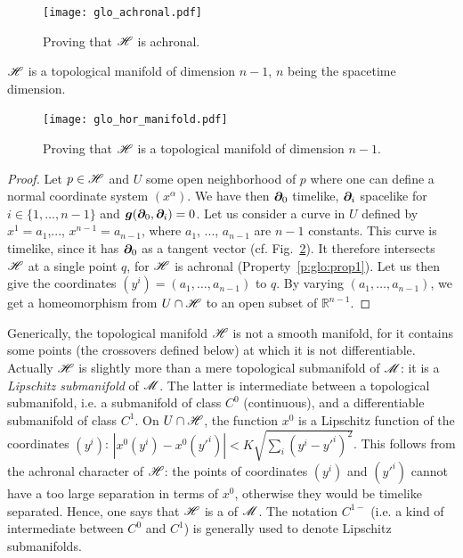 \begin{figure}
\centerline{\texttt{[image: glo\_achronal.pdf]}}
\caption[]{\label{f:glo:achronal} \footnotesize
Proving that $\mathscr{H}$ is achronal.}
\end{figure}


\begin{prop}
\label{p:glo:prop2}
$\mathscr{H}$ is a topological manifold of dimension $n-1$, $n$ being the spacetime
dimension.
\end{prop}

\begin{figure}
\centerline{\texttt{[image: glo\_hor\_manifold.pdf]}}
\caption[]{\label{f:glo:hor_manifold} \footnotesize
Proving that $\mathscr{H}$ is a topological manifold of dimension $n-1$.}
\end{figure}

\begin{proof}
Let $p\in\mathscr{H}$ and $U$ some open neighborhood of $p$ where one can define
a normal coordinate system $(x^\alpha)$. We have then $\bm{\partial}_0$ timelike,
$\bm{\partial}_i$ spacelike for $i\in\{1,\ldots,n-1\}$ and $\bm{g}(\bm{\partial}_0, \bm{\partial}_i) = 0$.
Let us consider a curve in $U$ defined by $x^1 = a_1$,..., $x^{n-1} = a_{n-1}$,
where $a_1$, ..., $a_{n-1}$ are $n-1$ constants.
This curve is timelike, since it has $\bm{\partial}_0$ as a tangent vector
(cf. Fig.~\ref{f:glo:hor_manifold}).
It therefore intersects $\mathscr{H}$ at a single point $q$, for $\mathscr{H}$ is achronal
(Property~\ref{p:glo:prop1}).
Let us then give the coordinates $(y^i) = (a_1,\ldots,a_{n-1})$ to $q$.
By varying $(a_1,\ldots,a_{n-1})$, we get a homeomorphism from $U\cap\mathscr{H}$
to an open subset of $\mathbb{R}^{n-1}$.
\end{proof}

\begin{remark}
Generically, the topological manifold $\mathscr{H}$ is not a smooth manifold, for it
contains some points (the crossovers defined below) at which it is not differentiable.
Actually $\mathscr{H}$ is slightly more than a mere topological submanifold of $\mathscr{M}$: it is a
\emph{Lipschitz submanifold} of $\mathscr{M}$. The latter is
intermediate between a topological submanifold, i.e.
a submanifold of class $C^0$ (continuous), and a differentiable submanifold of
class $C^1$. On $U\cap\mathscr{H}$, the function $x^0$ is a Lipschitz function
of the coordinates $(y^i)$: $\left|x^0(y^i) - x^0({y'}^i)\right| < K \sqrt{\sum_i (y^i - {y'}^i)^2}$.
This follows from the achronal character of $\mathscr{H}$: the points of coordinates
$(y^i)$ and $({y'}^i)$ cannot have a too large separation in terms of $x^0$,
otherwise they would be timelike separated.
Hence, one says that $\mathscr{H}$ is a  of $\mathscr{M}$. The notation $C^{1-}$ (i.e. a kind of intermediate between
$C^0$ and $C^1$) is generally used to denote Lipschitz submanifolds.
\end{remark}

